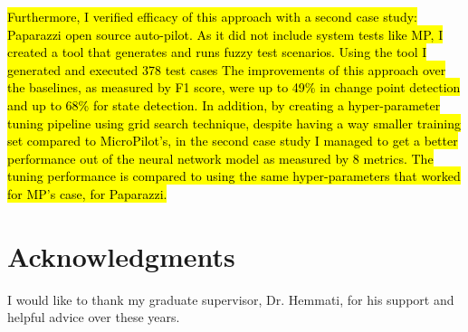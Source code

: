 \hl{Furthermore, I verified efficacy of this approach with a second case study: Paparazzi open source auto-pilot. As it did not include system tests like MP, I created a tool that generates and runs fuzzy test scenarios. Using the tool I generated and executed 378 test cases %
The improvements of this approach over the baselines, as measured by F1 score, were up to 49\% in change point detection and up to 68\% for state detection.
In addition, by creating a hyper-parameter tuning pipeline using grid search technique, despite having a way smaller training set compared to MicroPilot's, in the second case study I managed to get a better performance out of the neural network model as measured by 8 metrics. The tuning performance is compared to using the same hyper-parameters that worked for MP's case, for Paparazzi.}%




\chapter{Acknowledgments}
I would like to thank my graduate supervisor, Dr. Hemmati, for his support and helpful advice over these years. 




\dedication{To the ones who made this a smoother journey.} 


\tableofcontents


\listoftables


\listoffigures

